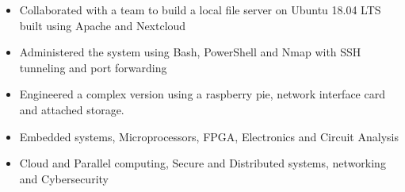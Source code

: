 \documentclass[11pt,a4paper,ragged2e]{altacv}
\begin{document}
\begin{paracol}{1}
\begin{itemize}
\item Collaborated with a team to build a local file server on Ubuntu 18.04 LTS built using Apache and Nextcloud
\item Administered the system using Bash, PowerShell and Nmap with SSH tunneling and port forwarding
\item Engineered a complex version using a raspberry pie, network interface card and attached storage.
\end{itemize}

\medskip

\begin{itemize}
\item Embedded systems, Microprocessors, FPGA, Electronics and Circuit Analysis
\item Cloud and Parallel computing, Secure and Distributed systems, networking and Cybersecurity
\end{itemize}






\end{paracol}
\end{document}
